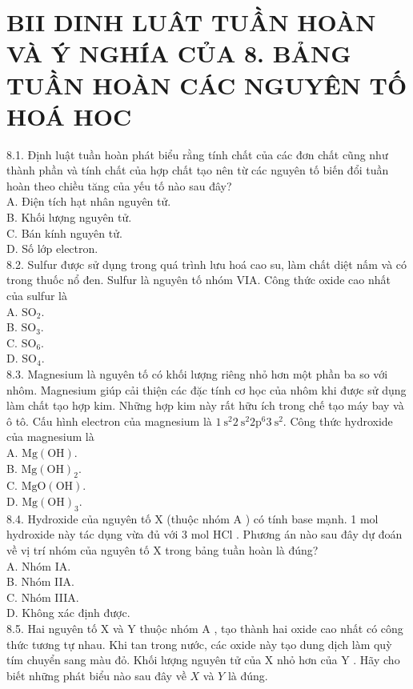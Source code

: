 \documentclass[10pt]{article}
\begin{document}
\section*{BII DINH LUÂT TUẦN HOÀN VÀ Ý NGHÍA CỦA 8. BẢNG TUẦN HOÀN CÁC NGUYÊN TỐ HOÁ HOC}
8.1. Định luật tuần hoàn phát biểu rằng tính chất của các đơn chất cũng như thành phần và tính chất của hợp chất tạo nên từ các nguyên tố biến đổi tuần hoàn theo chiều tăng của yếu tố nào sau đây?\\
A. Điện tích hạt nhân nguyên tử.\\
B. Khối lượng nguyên tử.\\
C. Bán kính nguyên tử.\\
D. Số lớp electron.\\
8.2. Sulfur được sử dụng trong quá trình lưu hoá cao su, làm chất diệt nấm và có trong thuốc nổ đen. Sulfur là nguyên tố nhóm VIA. Công thức oxide cao nhất của sulfur là\\
A. $\mathrm{SO}_{2}$.\\
B. $\mathrm{SO}_{3}$.\\
C. $\mathrm{SO}_{6}$.\\
D. $\mathrm{SO}_{4}$.\\
8.3. Magnesium là nguyên tố có khối lượng riêng nhỏ hơn một phần ba so với nhôm. Magnesium giúp cải thiện các đặc tính cơ học của nhôm khi được sử dụng làm chất tạo hợp kim. Những hợp kim này rất hữu ích trong chế tạo máy bay và ô tô. Cấu hình electron của magnesium là $1 \mathrm{~s}^{2} 2 \mathrm{~s}^{2} 2 \mathrm{p}^{6} 3 \mathrm{~s}^{2}$. Công thức hydroxide của magnesium là\\
A. $\mathrm{Mg}(\mathrm{OH})$.\\
B. $\mathrm{Mg}(\mathrm{OH})_{2}$.\\
C. $\mathrm{MgO}(\mathrm{OH})$.\\
D. $\mathrm{Mg}(\mathrm{OH})_{3}$.\\
8.4. Hydroxide của nguyên tố X (thuộc nhóm A ) có tính base mạnh. 1 mol hydroxide này tác dụng vừa đủ với 3 mol HCl . Phương án nào sau đây dự đoán về vị trí nhóm của nguyên tố X trong bảng tuần hoàn là đúng?\\
A. Nhóm IA.\\
B. Nhóm IIA.\\
C. Nhóm IIIA.\\
D. Không xác định được.\\
8.5. Hai nguyên tố X và Y thuộc nhóm A , tạo thành hai oxide cao nhất có công thức tương tự nhau. Khi tan trong nước, các oxide này tạo dung dịch làm quỳ tím chuyển sang màu đỏ. Khối lượng nguyên tử của X nhỏ hơn của Y . Hãy cho biết những phát biểu nào sau đây về $X$ và $Y$ là đúng.\\
\end{document}
